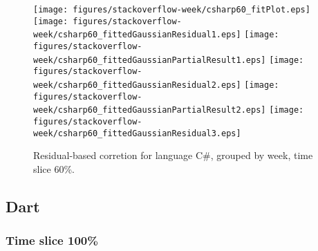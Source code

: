 \begin{figure}[t]
\centering
{}
{\texttt{[image: figures/stackoverflow-week/csharp60\_fitPlot.eps]}}
{\texttt{[image: figures/stackoverflow-week/csharp60\_fittedGaussianResidual1.eps]}}
{\texttt{[image: figures/stackoverflow-week/csharp60\_fittedGaussianPartialResult1.eps]}}
{\texttt{[image: figures/stackoverflow-week/csharp60\_fittedGaussianResidual2.eps]}}
{\texttt{[image: figures/stackoverflow-week/csharp60\_fittedGaussianPartialResult2.eps]}}
{\texttt{[image: figures/stackoverflow-week/csharp60\_fittedGaussianResidual3.eps]}}
\caption{Residual-based corretion for language C\#, grouped by week, time slice 60\%.}
\end{figure}


\FloatBarrier


\subsection{Dart}

\subsubsection{Time slice 100\%}

